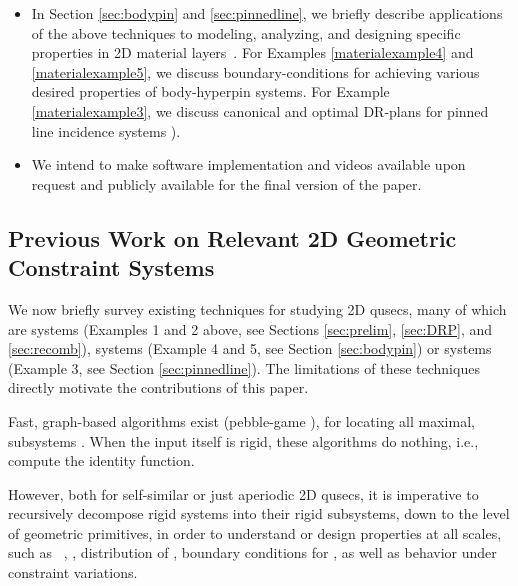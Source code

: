 \begin{itemize}
  \item In Section \ref{sec:bodypin} and \ref{sec:pinnedline}, we briefly describe applications of the above techniques to modeling, analyzing, and designing specific properties in 2D material layers~\cite{Jackson2008bodypin}. For Examples \ref{materialexample4} and \ref{materialexample5}, we discuss boundary-conditions for achieving various desired properties of body-hyperpin systems. For Example \ref{materialexample3}, we discuss canonical and optimal DR-plans for pinned line incidence systems \cite{sitharam2014incidence}).

  \item We intend to make software implementation and videos available upon request and publicly available for the final version of the paper.
\end{itemize}





\subsection{Previous Work on Relevant 2D Geometric Constraint Systems}
\label{sec:intro:prevwork}

We now briefly survey existing techniques for studying 2D qusecs,  many of which are  systems (Examples 1 and 2 above, see Sections \ref{sec:prelim}, \ref{sec:DRP}, and \ref{sec:recomb}),  systems (Example 4 and 5, see Section \ref{sec:bodypin}) or  systems (Example 3, see Section \ref{sec:pinnedline}). The limitations of these techniques directly motivate the contributions of this paper.

\medskip\noindent
{}
Fast, graph-based algorithms exist (pebble-game \cite{Jacobs:1997:PG,lee2005finding}), for locating all maximal,  subsystems \seedefs. When the input itself is rigid, these algorithms do nothing, i.e., compute the identity function.

However, both for self-similar or just aperiodic 2D qusecs, it is imperative to recursively decompose rigid systems into their rigid subsystems, down to the level of geometric primitives, in order to understand or design properties at all scales, such as \seedefs\ , , distribution of , boundary conditions for , as well as behavior under constraint variations.

